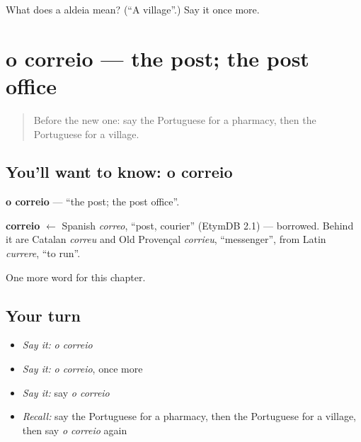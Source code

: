 \begin{tcolorbox}[breakable,colback=teal!4,colframe=teal!35!black,title={Before you move on}]
What does a aldeia mean? (\textquotedblleft{}A village\textquotedblright{}.) Say it once more.
\end{tcolorbox}
\section[o correio]{o correio — the post; the post office}

\label{lesson:PT-C76-correio}



\begin{quote}
Before the new one: say the Portuguese for a pharmacy, then the Portuguese for a village.
\end{quote}

\subsection*{You'll want to know: o correio}
\textbf{o correio} — \textquotedblleft{}the post; the post office\textquotedblright{}.

\begin{cousinweb}
\textbf{correio} $\leftarrow$ Spanish \emph{correo}, \textquotedblleft{}post, courier\textquotedblright{} (EtymDB 2.1) — borrowed. Behind it are Catalan \emph{correu} and Old Provençal \emph{corrieu}, \textquotedblleft{}messenger\textquotedblright{}, from Latin \emph{currere}, \textquotedblleft{}to run\textquotedblright{}.
\end{cousinweb}

\begin{grammarlens}[title={What you've built}]
One more word for this chapter.
\end{grammarlens}

\subsection*{Your turn}
\begin{itemize}
\raggedright
  \item \emph{Say it:} \emph{o correio}
  \item \emph{Say it:} \emph{o correio}, once more
  \item \emph{Say it:} say \emph{o correio}
  \item \emph{Recall:} say the Portuguese for a pharmacy, then the Portuguese for a village, then say \emph{o correio} again
\end{itemize}

